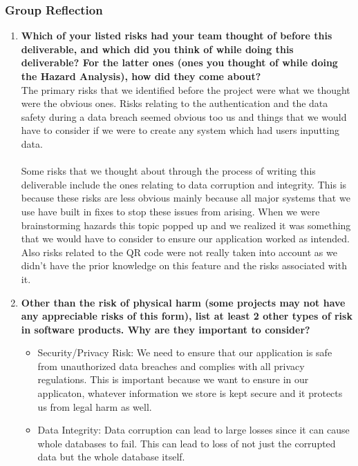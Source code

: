 \documentclass[12pt]{article}
\begin{document}
\subsubsection*{Group Reflection}
\begin{enumerate}
    \item \textbf{Which of your listed risks had your team thought of before this deliverable, and which did you think of while doing this deliverable? For the latter ones (ones you thought of while doing the Hazard Analysis), how did they come about?} \\
    The primary risks that we identified before the project were what we thought were the obvious ones. Risks relating to the authentication and the data safety during a data breach seemed obvious too us and things that we would have to consider if we were to create any system which had users inputting data. \\
    \\
    Some risks that we thought about through the process of writing this deliverable include the ones relating to data corruption and integrity. This is because these risks are less obvious mainly because all major systems that we use have built in fixes to stop these issues from arising. When we were brainstorming hazards this topic popped up and we realized it was something that we would have to consider to ensure our application worked as intended. Also risks related to the QR code were not really taken into account as we didn't have the prior knowledge on this feature and the risks associated with it. 
    \item \textbf{Other than the risk of physical harm (some projects may not have any appreciable risks of this form), list at least 2 other types of risk in software products. Why are they important to consider?}
    \begin{itemize}
        \item Security/Privacy Risk: We need to ensure that our application is safe from unauthorized data breaches and complies with all privacy regulations. This is important because we want to ensure in our applicaton, whatever information we store is kept secure and it protects us from legal harm as well.
        \item Data Integrity: Data corruption can lead to large losses since it can cause whole databases to fail. This can lead to loss of not just the corrupted data but the whole database itself.
    \end{itemize}
\end{enumerate}
\end{document}
